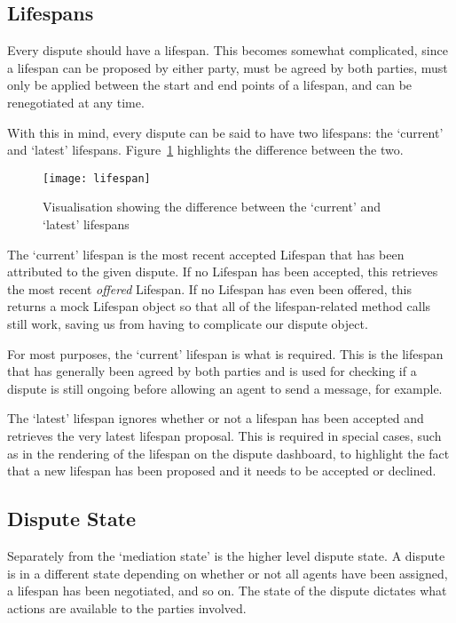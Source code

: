 \subsection{Lifespans}

Every dispute should have a lifespan. This becomes somewhat complicated, since a lifespan can be proposed by either party, must be agreed by both parties, must only be applied between the start and end points of a lifespan, and can be renegotiated at any time.

With this in mind, every dispute can be said to have two lifespans: the `current' and `latest' lifespans. Figure~\ref{uml:lifespan} highlights the difference between the two. 

\begin{figure}[h!]
  \centering
    \ifimages
    \texttt{[image: lifespan]}
    \fi
  \caption{Visualisation showing the difference between the `current' and `latest' lifespans}
  \label{uml:lifespan}
\end{figure}

The `current' lifespan is the most recent accepted Lifespan that has been attributed to the given dispute. If no Lifespan has been accepted, this retrieves the most recent \emph{offered} Lifespan. If no Lifespan has even been offered, this returns a mock Lifespan object so that all of the lifespan-related method calls still work, saving us from having to complicate our dispute object.

For most purposes, the `current' lifespan is what is required. This is the lifespan that has generally been agreed by both parties and is used for checking if a dispute is still ongoing before allowing an agent to send a message, for example.

The `latest' lifespan ignores whether or not a lifespan has been accepted and retrieves the very latest lifespan proposal. This is required in special cases, such as in the rendering of the lifespan on the dispute dashboard, to highlight the fact that a new lifespan has been proposed and it needs to be accepted or declined.

\subsection{Dispute State}

Separately from the `mediation state' is the higher level dispute state. A dispute is in a different state depending on whether or not all agents have been assigned, a lifespan has been negotiated, and so on. The state of the dispute dictates what actions are available to the parties involved.

